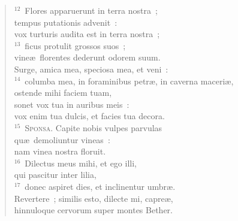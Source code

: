 \begin{flushleft}
\begin{verse}
${}^{12}$~Flores apparuerunt in terra nostra~;\\ tempus putationis advenit~:\\ vox turturis audita est in terra nostra~;\\
${}^{13}$~ficus protulit grossos suos~;\\ vine\ae\ florentes dederunt odorem suum.\\ Surge, amica mea, speciosa mea, et veni~:\\
${}^{14}$~columba mea, in foraminibus petr\ae , in caverna maceri\ae ,\\ ostende mihi faciem tuam,\\ sonet vox tua in auribus meis~:\\ vox enim tua dulcis, et facies tua decora.\\
${}^{15}$~\textsc{Sponsa.} Capite nobis vulpes parvulas\\ qu\ae\ demoliuntur vineas~:\\ nam vinea nostra floruit.\\
${}^{16}$~Dilectus meus mihi, et ego illi,\\ qui pascitur inter lilia,\\
${}^{17}$~donec aspiret dies, et inclinentur umbr\ae .\\ Revertere~; similis esto, dilecte mi, capre\ae ,\\ hinnuloque cervorum super montes Bether.\end{verse}\end{flushleft}


